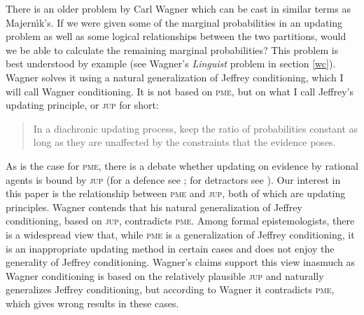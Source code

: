 \documentclass[entropy,article,accept,oneauthor,pdftex,12pt,a4paper]{mdpi}
\newenvironment{quotex}{\begin{quote}\begin{footnotesize}}{\end{footnotesize}\end{quote}}
\begin{document}
There is an older problem by Carl Wagner \cite{ref-31} which can be cast in
similar terms as Majern{\'\i}k's. If we were given some of the
marginal probabilities in an updating problem as well as some logical
relationships between the two partitions, would we be able to
calculate the remaining marginal probabilities? This problem is best
understood by example (see Wagner's \emph{Linguist} problem in section
\ref{wc}). Wagner solves it using a natural generalization of Jeffrey
conditioning, which I will call Wagner conditioning. It is not based
on \textsc{pme}, but on what I call Jeffrey's updating principle, or
\textsc{jup} for short:

\begin{quotex}
  [\textsc{jup}] In a diachronic updating process, keep the ratio of
  probabilities constant as long as they are unaffected by the
  constraints that the evidence poses.
\end{quotex}

As is the case for \textsc{pme}, there is a debate whether updating on
evidence by rational agents is bound by \textsc{jup} (for a defence
see \cite{ref-28}; for detractors see \cite{ref-9}). Our interest in this paper is the
relationship between \textsc{pme} and \textsc{jup}, both of which are
updating principles. Wagner contends that his natural generalization
of Jeffrey conditioning, based on \textsc{jup}, contradicts
\textsc{pme}. Among formal epistemologists, there is a widespread view
that, while \textsc{pme} is a generalization of Jeffrey conditioning,
it is an inappropriate updating method in certain cases and does not
enjoy the generality of Jeffrey conditioning. Wagner's claims support
this view inasmuch as Wagner conditioning is based on the relatively
plausible \textsc{jup} and naturally generalizes Jeffrey conditioning,
but according to Wagner it contradicts \textsc{pme}, which gives wrong
results in these cases.

\end{document}
